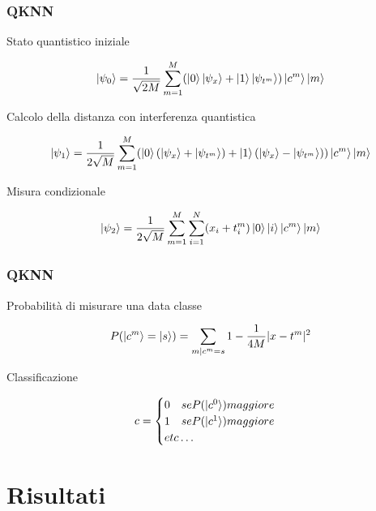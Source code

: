 \documentclass{beamer}
\begin{document}
	\begin{frame}
		\frametitle{QKNN}
	
		Stato quantistico iniziale

		\begin{equation*}
			\ket{\psi_0} = \frac{1}{\sqrt{2M}} \sum_{m=1}^M 
			(\ket{0}\ket{\psi_x}+\ket{1}\ket{\psi_{t^m}})\ket{c^m}\ket{m}
		\end{equation*}

		Calcolo della distanza con interferenza quantistica

		\begin{equation*}
			\ket{\psi_1} = \frac{1}{2\sqrt{M}}\sum_{m=1}^M 
			(\ket{0}(\ket{\psi_x}+\ket{\psi_{t^m}})+\ket{1}(\ket{\psi_x}-\ket{\psi_{t^m}}))\ket{c^m}\ket{m}
		\end{equation*}
	
		Misura condizionale

		\begin{equation*}
			\ket{\psi_2} = \frac{1}{2\sqrt{M}} \sum_{m=1}^M \sum_{i=1}^N
			(x_i+t_i^m)\ket{0}\ket{i}\ket{c^m}\ket{m}
		\end{equation*}

		

	\end{frame}

	\begin{frame}
		\frametitle{QKNN}
	
		Probabilità di misurare una data classe

		\begin{equation*}
			P(\ket{c^m} = \ket{s}) = \sum_{m|c^m=s} 
			1 - \frac{1}{4M} |x-t^m|^2
		\end{equation*}

		Classificazione

		\begin{equation*}
			c = \begin{cases}
			0 \quad se P(\ket{c^0}) maggiore \\
			1 \quad se P(\ket{c^1}) maggiore \\
			etc\ldots
		\end{cases}
		\end{equation*}
	
	\end{frame}

	\section{Risultati}
\end{document}
